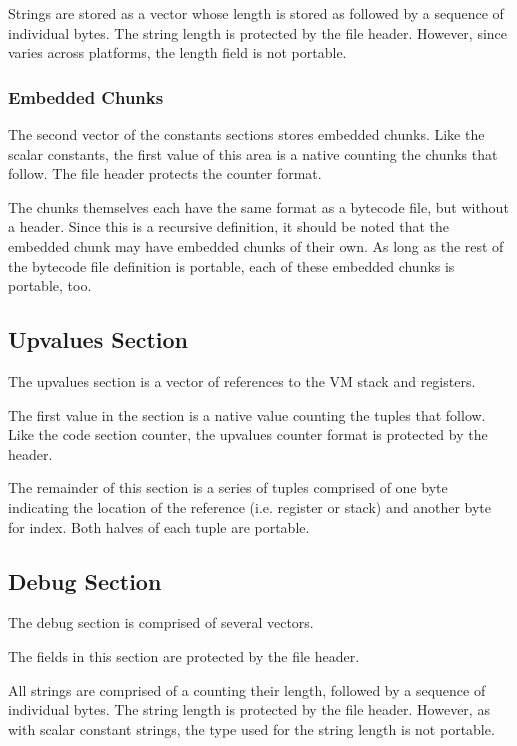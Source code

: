 	Strings are stored as a vector whose length is stored as
	 followed by a sequence of individual bytes.  The
	string length is protected by the file header.  However, since
	 varies across platforms, the length field is not
	portable.

\subsubsection{Embedded Chunks}

	The second vector of the constants sections stores embedded chunks.
	Like the scalar constants, the first value of this area is a native
	 counting the chunks that follow.  The file header
	protects the counter format.

	The chunks themselves each have the same format as a bytecode file, but
	without a header.  Since this is a recursive definition, it should be
	noted that the embedded chunk may have embedded chunks of their own.
	As long as the rest of the bytecode file definition is portable, each
	of these embedded chunks is portable, too.

\subsection{Upvalues Section}

	The upvalues section is a vector of references to the VM stack and
	registers.

	The first value in the section is a native  value counting
	the tuples that follow.  Like the code section counter, the upvalues
	counter format is protected by the header.

	The remainder of this section is a series of tuples comprised of one
	byte indicating the location of the reference (i.e. register or stack)
	and another byte for index.  Both halves of each tuple are portable.

\subsection{Debug Section}

	The debug section is comprised of several vectors.

	The  fields in this section are protected by the file
	header.

	All strings are comprised of a  counting their length,
	followed by a sequence of individual bytes.  The string length is
	protected by the file header.  However, as with scalar constant
	strings, the  type used for the string length is not
	portable.

